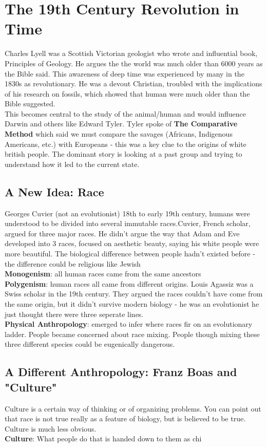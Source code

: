 \documentclass{article}
\begin{document}
\section{The 19th Century Revolution in Time}
Charles Lyell was a Scottish Victorian geologist who wrote and influential book, Principles of Geology. He argues the the world was much older than 6000 years as the Bible said. This awareness of deep time was experienced by many in the 1830s as revolutionary. He was a devout Christian, troubled with the implications of his research on fossils, which showed that human were much older than the Bible suggested. \\
This becomes central to the study of the animal/human and would influence Darwin and others like Edward Tyler. Tyler spoke of \textbf{The Comparative Method} which said we must compare the savages (Africans, Indigenous Americans, etc.) with Europeans - this was a key clue to the origins of white british people. The dominant story is looking at a past group and trying to understand how it led to the current state. 

\subsection{A New Idea: Race}
Georges Cuvier (not an evolutionist) 18th to early 19th century, humans were understood to be divided into several immutable races.Cuvier, French scholar, argued for three major races. He didn't argue the way that Adam and Eve developed into 3 races, focused on aesthetic beauty, saying his white people were more beautiful. The biological difference between people hadn't existed before - the difference could be religious like Jewish \\
\textbf{Monogenism}: all human races came from the same ancestors \\
\textbf{Polygenism}: human races all came from different origins. Louis Agassiz was a Swiss scholar in the 19th century. They argued the races couldn't have come from the same origin, but it didn't survive modern biology - he was an evolutionist he just thought there were three seperate lines. \\ 
\textbf{Physical Anthropology}: emerged to infer where races fir on an evolutionary ladder. People became concerned about race mixing. People though mixing these three different species could be eugenically dangerous.

\subsection{A Different Anthropology: Franz Boas and "Culture"}
Culture is a certain way of thinking or of organizing problems. You can point out that race is not true really as a feature of biology, but is believed to be true. Culture is much less obvious. \\
\textbf{Culture}: What people do that is handed down to them as chi
\end{document}
